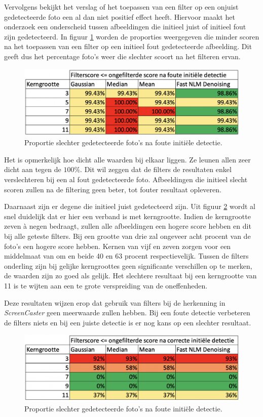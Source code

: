Vervolgens bekijkt het verslag of het toepassen van een filter op een onjuist gedetecteerde foto een al dan niet positief effect heeft.
Hiervoor maakt het onderzoek een onderscheid tussen afbeeldingen die initieel juist of initieel fout zijn gedetecteerd. 
In figuur \ref{fig:initieelfout} worden de proporties weergegeven die minder scoren na het toepassen van een filter op een initieel fout gedetecteerde afbeelding. Dit geeft dus het percentage foto's weer die slechter scoort na het filteren ervan.

\begin{figure}[h!]
  \includegraphics[width=\linewidth]{img/initieelFout}
  \caption{Proportie slechter gedetecteerde foto's na foute initiële detectie.}
  \label{fig:initieelfout}
\end{figure}

Het is opmerkelijk hoe dicht alle waarden bij elkaar liggen. Ze leunen allen zeer dicht aan tegen de $100\%$. Dit wil zeggen dat de filters de resultaten enkel verslechteren bij een al fout gedetecteerde foto. Afbeeldingen die initieel slecht scoren zullen na de filtering geen beter, tot fouter resultaat opleveren. 

Daarnaast zijn er degene die initieel juist gedetecteerd zijn. Uit figuur \ref{fig:initieeljuist} wordt al snel duidelijk dat er hier een verband is met kerngrootte. Indien de kerngrootte zeven à negen bedraagt, zullen alle afbeeldingen een hogere score hebben en dit bij alle geteste filters. Bij een grootte van drie zal ongeveer acht procent van de foto's een hogere score hebben. Kernen van vijf en zeven zorgen voor een middelmaat van om en beide 40 en 63 procent respectievelijk. Tussen de filters onderling zijn bij gelijke kerngroottes geen significante verschillen op te merken, de waarden zijn zo goed als gelijk. Het slechtere resultaat bij een kerngrootte van 11 is te wijten aan een te grote verspreiding van de oneffenheden.

Deze resultaten wijzen erop dat gebruik van filters bij de herkenning in {\it ScreenCaster} geen meerwaarde zullen hebben. Bij een foute detectie verbeteren de filters niets en bij een juiste detectie is er nog kans op een slechter resultaat.

\begin{figure}[h!]
  \includegraphics[width=\linewidth]{img/initieeljuist}
  \caption{Proportie slechter gedetecteerde foto's na foute initiële detectie.}
  \label{fig:initieeljuist}
\end{figure}